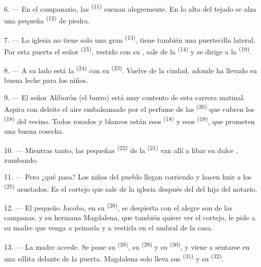 6. --- En el campanario, las  \textsuperscript{(11)} suenan
alegremente. En lo alto del tejado se alza una pequeña 
\textsuperscript{(12)} de piedra.

7. --- La iglesia no tiene solo una gran  \textsuperscript{(13)},
tiene también una puertecilla lateral. Por esta puerta el señor
 \textsuperscript{(15)}, vestido con su , sale de la
 \textsuperscript{(14)} y se dirige a la 
\textsuperscript{(19)}.

8. --- A su lado está la  \textsuperscript{(24)} con su
 \textsuperscript{(23)}. Vuelve de la ciudad, adonde ha llevado su
buena leche para los niños.

\VUsaut{4.0mm}
\VUsaut{3.4mm}

9. --- El señor Aliborón (el burro) está muy contento de esta carrera
matinal. Aspira con deleite el aire embalsamado por el perfume de las
 \textsuperscript{(20)} que cubren los 
\textsuperscript{(18)} del  vecino. Todos rosados y blancos están
esos  \textsuperscript{(18)} y esos 
\textsuperscript{(19)}, que prometen una buena cosecha.

10. --- Mientras tanto, las pequeñas  \textsuperscript{(22)} de la
 \textsuperscript{(21)} van allí a libar su dulce ,
zumbando.

11. --- Pero ¿qué pasa? Los niños del pueblo llegan
corriendo y hacen huir a los  \textsuperscript{(25)} asustados. Es el
cortejo que sale de la iglesia después del  del hijo del
notario.

12. --- El pequeño Jacobo, en su  \textsuperscript{(26)}, se despierta
con el alegre son de las campanas, y su hermana Magdalena, que también
quiere ver el cortejo, le pide a su madre que venga a peinarla y a
vestirla en el umbral de la casa.

13. --- La madre accede. Se pone su 
\textsuperscript{(28)}, su  \textsuperscript{(29)} y su 
\textsuperscript{(30)}, y viene a sentarse en una sillita delante de la puerta.
Magdalena solo lleva sus  \textsuperscript{(31)} y su 
\textsuperscript{(32)}.

